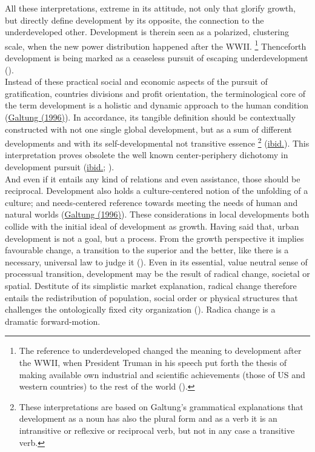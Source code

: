 \documentclass[11pt]{report}
\begin{document}
All these interpretations, extreme in its attitude, not only that glorify growth, but directly define development by its opposite, the connection to the underdeveloped other.
Development is therein seen as a polarized, clustering scale, when the new power distribution happened after the WWII.
\footnote{The reference to underdeveloped changed the meaning to development after the WWII, when President Truman in his speech put forth the thesis of making available own industrial and scientific achievements (those of US and western countries) to the rest of the world (\href{Esteva}{\cite{Esteva2010}}).}
Thenceforth development is being marked as a ceaseless pursuit of escaping underdevelopment (\href{Esteva}{\cite{Esteva2010}}).
\\

Instead of these practical social and economic aspects of the pursuit of gratification, countries divisions and profit orientation, the terminological core of the term development is a holistic and dynamic approach to the human condition (\href{Galtung}{Galtung (1996)}). 
In accordance, its tangible definition should be contextually constructed with not one single global development, but as a sum of different developments and with its self-developmental not transitive essence
\footnote{These interpretations are based on Galtung's grammatical explanations that development as a noun has also the plural form and as a verb it is an intransitive or reflexive or reciprocal verb, but not in any case a transitive verb.}
(\href{Galtung}{ibid.}).
This interpretation proves obsolete the well known center-periphery dichotomy in development pursuit (\href{Galtung}{ibid.}; \href{Robinson}{\cite{Robinson2006}}).
\\

And even if it entails any kind of relations and even assistance, those should be reciprocal.
Development also holds a culture-centered notion of the unfolding of a culture; and needs-centered reference towards meeting the needs of human and natural worlds (\href{Galtung}{Galtung (1996)}).
These considerations in local developments both collide with the initial ideal of development as growth.
Having said that, urban development is not a goal, but a process.
From the growth perspective it implies favourable change, a transition to the superior and the better, like there is a necessary, universal law to judge it (\href{Esteva}{\cite{Esteva2010}}).
Even in its essential, value neutral sense of processual transition, development may be the result of radical change, societal or spatial.
Destitute of its simplistic market explanation, radical change therefore entails the redistribution of population, social order or physical structures that challenges the ontologically fixed city organization (\href{Brenner}{\cite{BrennerAndSchmidt2013}}).
Radica change is a dramatic forward-motion.
\\
\end{document}
